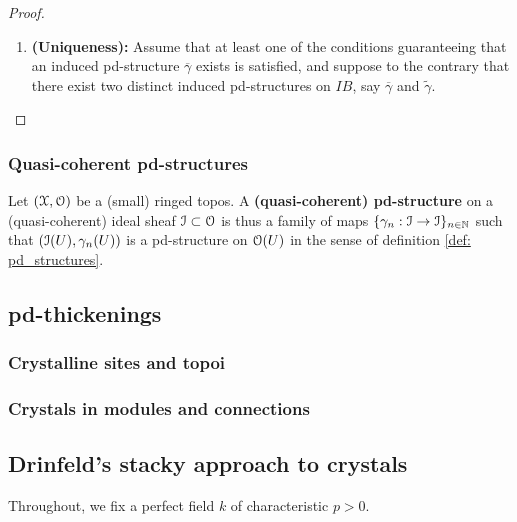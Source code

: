 \begin{proof}
\begin{enumerate}
\begin{enumerate}
                                \end{enumerate}
                            \item \textbf{(Uniqueness):} Assume that at least one of the conditions guaranteeing that an induced pd-structure $\overline{\gamma}$ exists is satisfied, and suppose to the contrary that there exist two distinct induced pd-structures on $IB$, say $\overline{\gamma}$ and $\tilde{\gamma}$.
                        \end{enumerate}
                    \end{proof}
                    
            \subsubsection{Quasi-coherent pd-structures}
                \begin{definition} \label{def: quasi_coherent_pd_structures}
                    Let $(\mathcal{X}, \mathcal{O})$ be a (small) ringed topos. A \textbf{(quasi-coherent) pd-structure} on a (quasi-coherent) ideal sheaf $\mathcal{I} \subset \mathcal{O}$ is thus a family of maps $\{\gamma_n: \mathcal{I} \to \mathcal{I}\}_{n \in \mathbb{N}}$ such that $(\mathcal{I}(U), \gamma_n(U))$ is a pd-structure on $\mathcal{O}(U)$ in the sense of definition \ref{def: pd_structures}. 
                \end{definition}
                    
        \subsection{pd-thickenings}
            \subsubsection{Crystalline sites and topoi}
            
            \subsubsection{Crystals in modules and connections}
                
        \subsection{Drinfeld's stacky approach to crystals}
            \begin{convention}
                Throughout, we fix a perfect field $k$ of characteristic $p > 0$.
            \end{convention}
            
